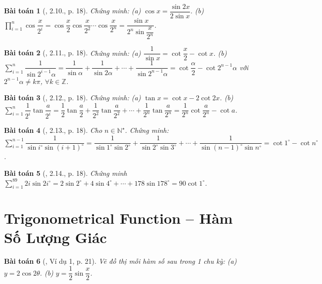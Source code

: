\documentclass{article}
\newtheorem{baitoan}{Bài toán}
\begin{document}
\begin{baitoan}[\cite{Hung_nang_cao_phat_trien_Toan_11_tap_1}, 2.10., p. 18]
	Chứng minh: (a) $\cos x = \dfrac{\sin2x}{2\sin x}$. (b) $\prod_{i=1}^n \cos\dfrac{x}{2^i} = \cos\dfrac{x}{2}\cos\dfrac{x}{2^2}\cdots\cos\dfrac{x}{2^n} = \dfrac{\sin x}{2^n\sin\dfrac{x}{2^n}}$.
\end{baitoan}

\begin{baitoan}[\cite{Hung_nang_cao_phat_trien_Toan_11_tap_1}, 2.11., p. 18]
	Chứng minh: (a) $\dfrac{1}{\sin x} = \cot\dfrac{x}{2} - \cot x$. (b) $\sum_{i=1}^n \dfrac{1}{\sin2^{i-1}\alpha} = \dfrac{1}{\sin\alpha} + \dfrac{1}{\sin2\alpha} + \cdots + \dfrac{1}{\sin2^{n-1}\alpha} = \cot\dfrac{\alpha}{2} - \cot2^{n-1}\alpha$ với $2^{n-1}\alpha\ne k\pi$, $\forall k\in\mathbb{Z}$.
\end{baitoan}

\begin{baitoan}[\cite{Hung_nang_cao_phat_trien_Toan_11_tap_1}, 2.12., p. 18]
	Chứng minh: (a) $\tan x = \cot x - 2\cot2x$. (b) $\sum_{i=1}^n \dfrac{1}{2^i}\tan\dfrac{a}{2^i} = \dfrac{1}{2}\tan\dfrac{a}{2} + \dfrac{1}{2^2}\tan\dfrac{a}{2^2} + \cdots + \dfrac{1}{2^n}\tan\dfrac{a}{2^n} = \dfrac{1}{2^n}\cot\dfrac{a}{2^n} - \cot a$.
\end{baitoan}

\begin{baitoan}[\cite{Hung_nang_cao_phat_trien_Toan_11_tap_1}, 2.13., p. 18]
	Cho $n\in\mathbb{N}^\star$. Chứng minh: $\sum_{i=1}^{n-1} \dfrac{1}{\sin i^\circ\sin(i + 1)^\circ} = \dfrac{1}{\sin1^\circ\sin2^\circ} + \dfrac{1}{\sin2^\circ\sin3^\circ} + \cdots + \dfrac{1}{\sin(n - 1)^\circ\sin n^\circ} = \cot1^\circ - \cot n^\circ$.
\end{baitoan}

\begin{baitoan}[\cite{Hung_nang_cao_phat_trien_Toan_11_tap_1}, 2.14., p. 18]
	Chứng minh $\sum_{i=1}^{89} 2i\sin2i^\circ = 2\sin2^\circ + 4\sin4^\circ + \cdots + 178\sin178^\circ = 90\cot1^\circ$.
\end{baitoan}


\section{Trigonometrical Function -- Hàm Số Lượng Giác}

\begin{baitoan}[\cite{Hung_nang_cao_phat_trien_Toan_11_tap_1}, Ví dụ 1, p. 21]
	Vẽ đồ thị mỗi hàm số sau trong 1 chu kỳ: (a) $y = 2\cos2\theta$. (b) $y = \dfrac{1}{2}\sin\dfrac{x}{2}$.
\end{baitoan}
\end{document}
